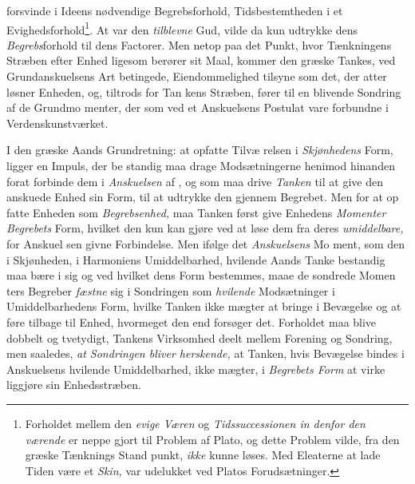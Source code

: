forsvinde i Ideens nødvendige Begrebsforhold, Tidsbestemtheden
i et Evighedsforhold\footnote{Forholdet mellem den \emph{evige Væren} og
\emph{Tidssuccessionen in\-%
denfor den værende} \emph{} er neppe gjort til Problem af
Plato, og dette Problem vilde, fra den græske Tænknings Stand\-%
punkt, \emph{ikke} kunne løses. Med Eleaterne at lade Tiden være et
\emph{Skin,} var udelukket ved Platos Forudsætninger.}. At 
var den \emph{tilblevne} Gud,
vilde da kun udtrykke dens \emph{Begrebs}forhold til dens Factorer.
Men netop paa det Punkt, hvor Tænkningens Stræben
efter Enhed ligesom berører sit Maal, kommer den græske
Tankes, ved Grundanskuelsens Art betingede, Eiendommelighed
tilsyne som det, der atter løsner Enheden, og, tiltrods for Tan\-%
kens Stræben, fører til en blivende Sondring af de Grundmo\-%
menter, der som ved et Anskuelsens Postulat vare forbundne
i Verdenskunstværket.

I den græske Aands Grundretning: at opfatte Tilvæ\-%
relsen i \emph{Skjønhedens} Form, ligger en Impuls, der be\-%
standig maa drage Modsætningerne henimod hinanden forat
forbinde dem i \emph{Anskuelsen} af , og som maa
drive \emph{Tanken} til at give den anskuede Enhed sin Form,
til at udtrykke den gjennem Begrebet. Men for at op\-%
fatte Enheden som \emph{Begrebsenhed,} maa Tanken først give
Enhedens \emph{Momenter Begrebets} Form, hvilket den kun kan
gjøre ved at løse dem fra deres \emph{umiddelbare,} for Anskuel\-%
sen givne Forbindelse. Men ifølge det \emph{Anskuelsens} Mo\-%
ment, som den i Skjønheden, i Harmoniens Umiddelbarhed,
hvilende Aands Tanke bestandig maa bære i sig og ved
hvilket dens Form bestemmes, maae de sondrede Momen\-%
ters Begreber \emph{fæstne} sig i Sondringen som \emph{hvilende}
Modsætninger i Umiddelbarhedens Form, hvilke Tanken ikke
mægter at bringe i Bevægelse og at føre tilbage til Enhed,
hvormeget den end forsøger det. Forholdet maa blive dobbelt
og tvetydigt, Tankens Virksomhed deelt mellem Forening og
Sondring, men saaledes, \emph{at Sondringen bliver herskende,}
at Tanken, hvis Bevægelse bindes i Anskuelsens hvilende
Umiddelbarhed, ikke mægter, i \emph{Begrebets Form} at virke\-%
liggjøre sin Enhedsstræben.

